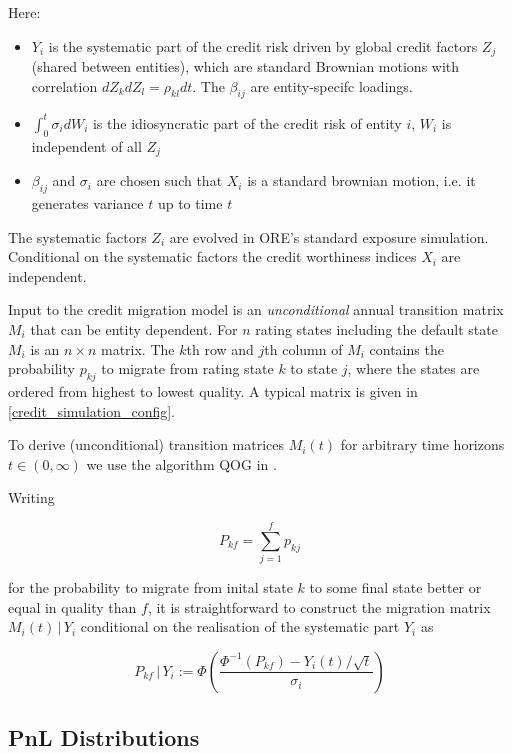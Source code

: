 \documentclass[12pt, a4paper]{article}
\begin{document}
Here:

\begin{itemize}
\item $Y_i$ is the systematic part of the credit risk driven by global credit factors $Z_j$ (shared between entities),
  which are standard Brownian motions with correlation $dZ_kdZ_l = \rho_{kl}dt$. The $\beta_{ij}$ are entity-specifc
  loadings.
\item $\int_0^t \sigma_i dW_i$ is the idiosyncratic part of the credit risk of entity $i$, $W_i$ is independent of all
  $Z_j$
\item $\beta_{ij}$ and $\sigma_i$ are chosen such that $X_i$ is a standard brownian motion, i.e. it generates variance
  $t$ up to time $t$
\end{itemize}

The systematic factors $Z_i$ are evolved in ORE's standard exposure simulation. Conditional on the systematic factors
the credit worthiness indices $X_i$ are independent.

Input to the credit migration model is an {\em unconditional} annual transition matrix $M_i$ that can be entity
dependent. For $n$ rating states including the default state $M_i$ is an $n \times n$ matrix. The $k$th row and $j$th
column of $M_i$ contains the probability $p_{kj}$ to migrate from rating state $k$ to state $j$, where the states are
ordered from highest to lowest quality. A typical matrix is given in \ref{credit_simulation_config}.

To derive (unconditional) transition matrices $M_i(t)$ for arbitrary time horizons $t \in (0,\infty)$ we use the
algorithm QOG in \cite{Kreinin2001}.

Writing

\begin{equation}
 P_{kf} = \sum_{j=1}^f p_{kj}
\end{equation}

for the probability to migrate from inital state $k$ to some final state better or equal in quality than $f$, it is
straightforward to construct the migration matrix $M_i(t)\,|\,Y_i$ conditional on the realisation of the systematic part
$Y_i$ as

\begin{equation}
P_{kf}\,|\, Y_i := \Phi\left( \frac{\Phi^{-1}(P_{kf}) - Y_i(t) / \sqrt{t}}{\sigma_i} \right)
\end{equation}

\subsection{PnL Distributions}
\end{document}
